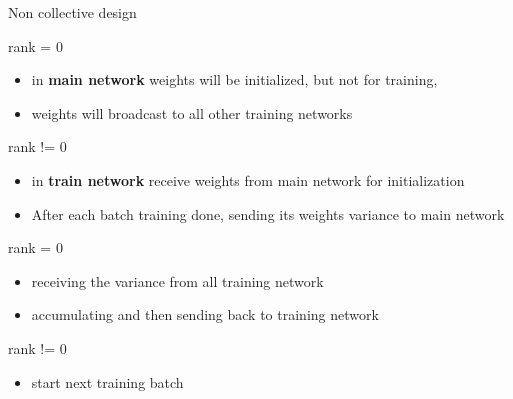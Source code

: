 \documentclass[presentation]{beamer}
\begin{document}
\begin{frame}[label={sec:org91aa4dc}]{Non collective design}
\begin{block}{rank = 0}
\begin{itemize}
\item in \textbf{main network} weights will be initialized, but not for training,
\item weights will broadcast to all other training networks
\end{itemize}
\end{block}
\begin{block}{rank != 0}
\begin{itemize}
\item in \textbf{train network} receive weights from main network for initialization
\item After each batch training done, sending its weights variance to main network
\end{itemize}
\end{block}
\begin{block}{rank = 0}
\begin{itemize}
\item receiving the  variance from all training network
\item accumulating and then sending back to training network
\end{itemize}
\end{block}
\begin{block}{rank != 0}
\begin{itemize}
\item start next training batch
\end{itemize}
\end{block}
\end{frame}
\end{document}
